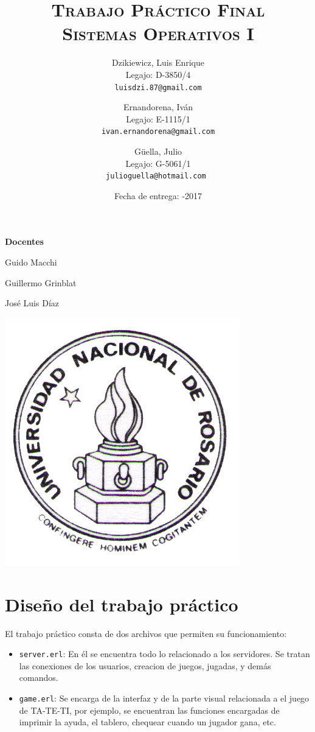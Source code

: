 \documentclass[a4paper]{article}
\author{
        Dzikiewicz, Luis Enrique\\
        Legajo: D-3850/4\\
        \texttt{luisdzi.87@gmail.com}
        \and Ernandorena, Iván\\
        Legajo: E-1115/1\\
        \texttt{ivan.ernandorena@gmail.com}
        \and Güella, Julio\\
        Legajo: G-5061/1\\
        \texttt{julioguella@hotmail.com }
}
\date{
    Fecha de entrega: -2017
}
\title {
    \Huge  \textsc{Trabajo Práctico Final\\}
    \large \textsc{Sistemas Operativos I}
}
\newcommand{\blacktr}[0]{\item[$\blacktriangleright$]}
\begin{document}

    \maketitle

    \thispagestyle{empty}

    \begin{center}
         \large \bf Docentes
    \end{center}

    \begin{center}
      Guido Macchi
      
      Guillermo Grinblat

      José Luis Díaz
        \vspace{2cm}

        \includegraphics[scale=1.5]{Logo-Unr}
    

    \end{center}


\newpage




\section*{Diseño del trabajo práctico}

El trabajo práctico consta de dos archivos que permiten su funcionamiento:
\begin{itemize}
  \blacktr \texttt{server.erl}: En él se encuentra todo lo relacionado a los servidores. Se tratan las conexiones de los usuarios, creacion de juegos, jugadas, y demás comandos.
  \blacktr \texttt{game.erl}: Se encarga de la interfaz y de la parte visual relacionada a el juego de TA-TE-TI, por ejemplo, se encuentran las funciones encargadas de imprimir la ayuda, el tablero, chequear cuando un jugador gana, etc. 
\end{itemize}
\end{document}
